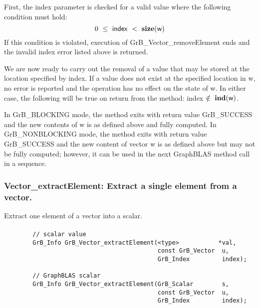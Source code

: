 First, the {\sf index} parameter is checked for a valid value where the following
condition must hold:
\[
	0\ \leq\ {\sf index}\ <\ \mathbf{size}({\sf w})
\]
If this condition is violated, execution of {\sf GrB\_Vector\_removeElement} 
ends and the invalid index error listed above is returned.

We are now ready to carry out the removal of a value that may be stored at the 
location specified by {\sf index}.  If a value does not exist at the specified 
location in {\sf w}, no error is reported and the operation has no effect on the 
state of {\sf w}.  In either case, the following will be true on return from the 
method: {\sf index} $\notin~\mathbf{ind}({\sf w})$.

In {\sf GrB\_BLOCKING} mode, the method exits with return value 
{\sf GrB\_SUCCESS} and the new contents of {\sf w} is as defined above
and fully computed.  
In {\sf GrB\_NONBLOCKING} mode, the method exits with return value 
{\sf GrB\_SUCCESS} and the new content of vector {\sf w} is as defined above 
but may not be fully computed; however, it can be used in the next GraphBLAS 
method call in a sequence.


\subsubsection{{\sf Vector\_extractElement}: Extract a single element from a vector.}
\label{Sec:Vector_extractElement}
\label{Sec:extract_single_element_vec}

Extract one element of a vector into a scalar. 

\paragraph{\syntax}

\begin{verbatim}
        // scalar value
        GrB_Info GrB_Vector_extractElement(<type>           *val,
                                           const GrB_Vector  u,
                                           GrB_Index         index); 

        // GraphBLAS scalar
        GrB_Info GrB_Vector_extractElement(GrB_Scalar        s,
                                           const GrB_Vector  u,
                                           GrB_Index         index); 
\end{verbatim}

